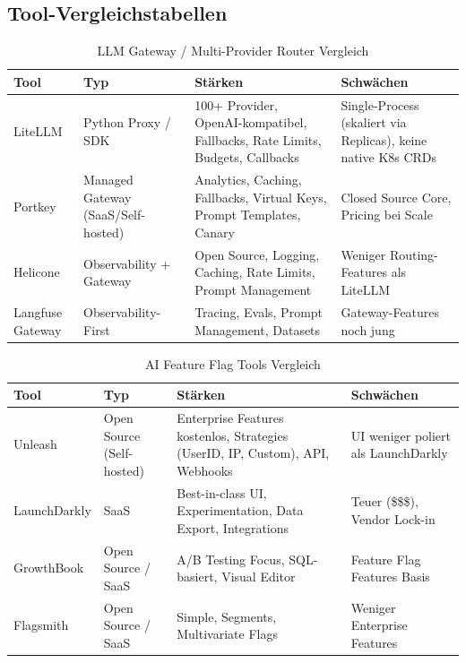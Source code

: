 \subsection*{Tool-Vergleichstabellen}
\begin{table}[H]
\centering
\begin{tabularx}{\linewidth}{lXXX}
\toprule
\textbf{Tool} & \textbf{Typ} & \textbf{Stärken} & \textbf{Schwächen} \\
\midrule
LiteLLM & Python Proxy / SDK & 100+ Provider, OpenAI-kompatibel, Fallbacks, Rate Limits, Budgets, Callbacks & Single-Process (skaliert via Replicas), keine native K8s CRDs \\
Portkey & Managed Gateway (SaaS/Self-hosted) & Analytics, Caching, Fallbacks, Virtual Keys, Prompt Templates, Canary & Closed Source Core, Pricing bei Scale \\
Helicone & Observability + Gateway & Open Source, Logging, Caching, Rate Limits, Prompt Management & Weniger Routing-Features als LiteLLM \\
Langfuse Gateway & Observability-First & Tracing, Evals, Prompt Management, Datasets & Gateway-Features noch jung \\
\bottomrule
\end{tabularx}
\caption{LLM Gateway / Multi-Provider Router Vergleich}
\label{tab:ch17_gateway_tools}
\end{table}

\begin{table}[H]
\centering
\begin{tabularx}{\linewidth}{lXXX}
\toprule
\textbf{Tool} & \textbf{Typ} & \textbf{Stärken} & \textbf{Schwächen} \\
\midrule
Unleash & Open Source (Self-hosted) & Enterprise Features kostenlos, Strategies (UserID, IP, Custom), API, Webhooks & UI weniger poliert als LaunchDarkly \\
LaunchDarkly & SaaS & Best-in-class UI, Experimentation, Data Export, Integrations & Teuer (\$\$\$), Vendor Lock-in \\
GrowthBook & Open Source / SaaS & A/B Testing Focus, SQL-basiert, Visual Editor & Feature Flag Features Basis \\
Flagsmith & Open Source / SaaS & Simple, Segments, Multivariate Flags & Weniger Enterprise Features \\
\bottomrule
\end{tabularx}
\caption{AI Feature Flag Tools Vergleich}
\label{tab:ch17_flag_tools}
\end{table}

